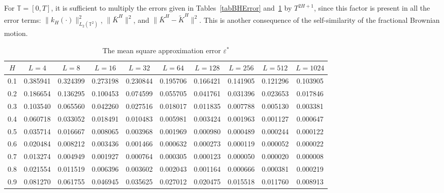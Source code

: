\documentclass[10pt,reqno]{amsart}
\theoremstyle{plain}
\theoremstyle{remark}
\newcommand{\LPTT}{{L_2(\mathds{T}^2)}}
\begin{document}
For $\mathds{T} = [0,T]$, it is sufficient to multiply the errors given in Tables~\ref{tabBHError} and~\ref{tabBHErrorAsterisk} by $T^{2H+1}$, since this factor is present in all the error terms: $\| k_H(\cdot) \|_\LPTT^2$, $\|\bar K^H\|^2$, and $\|\bar K^H - \tilde K^H\|^2$. This is another consequence of the self-similarity of the fractional Brownian motion.

\begin{table}[ht]
\begin{center}
\renewcommand{\arraystretch}{1.1}
\caption{The mean square approximation error $\varepsilon^*$}\label{tabBHErrorAsterisk}
\begin{tabular}{cccccccccc}
  \hline
  $H$ & $L = 4$ & $L = 8$ & $L = 16$ & $L = 32$ & $L = 64$ & $L = 128$ & $L = 256$ & $L = 512$ & $L = 1024$ \\
  \hline
  0.1 & 0.385941 & 0.324399 & 0.273198 & 0.230844 & 0.195706 & 0.166421 & 0.141905 & 0.121296 & 0.103905 \\
  0.2 & 0.186654 & 0.136295 & 0.100453 & 0.074599 & 0.055705 & 0.041761 & 0.031396 & 0.023653 & 0.017846 \\
  0.3 & 0.103540 & 0.065560 & 0.042260 & 0.027516 & 0.018017 & 0.011835 & 0.007788 & 0.005130 & 0.003381 \\
  0.4 & 0.060718 & 0.033052 & 0.018491 & 0.010483 & 0.005981 & 0.003424 & 0.001963 & 0.001127 & 0.000647 \\
  0.5 & 0.035714 & 0.016667 & 0.008065 & 0.003968 & 0.001969 & 0.000980 & 0.000489 & 0.000244 & 0.000122 \\
  0.6 & 0.020484 & 0.008212 & 0.003436 & 0.001466 & 0.000632 & 0.000273 & 0.000119 & 0.000052 & 0.000022 \\
  0.7 & 0.013274 & 0.004949 & 0.001927 & 0.000764 & 0.000305 & 0.000123 & 0.000050 & 0.000020 & 0.000008 \\
  0.8 & 0.021554 & 0.011519 & 0.006396 & 0.003602 & 0.002043 & 0.001164 & 0.000666 & 0.000381 & 0.000219 \\
  0.9 & 0.081270 & 0.061755 & 0.046945 & 0.035625 & 0.027012 & 0.020475 & 0.015518 & 0.011760 & 0.008913 \\
  \hline
\end{tabular}
\end{center}
\end{table}
\end{document}
